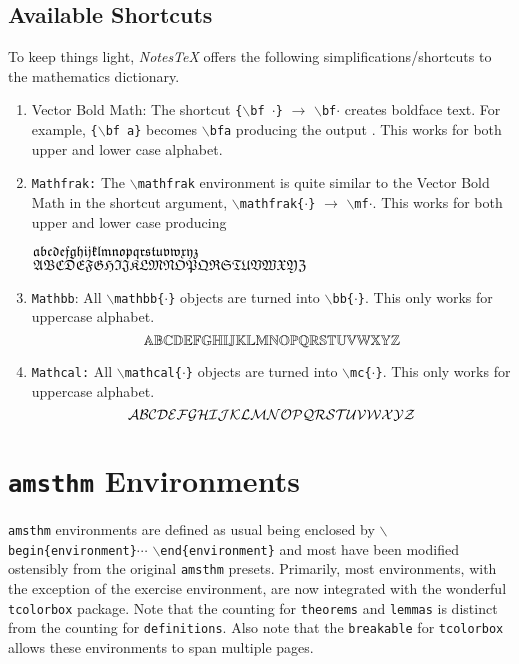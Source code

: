 \documentclass[10pt]{article}
\begin{document}
	\subsection{Available Shortcuts}
	To keep things light, \textit{NotesTeX} offers the following simplifications/shortcuts to the mathematics dictionary.
	\begin{enumerate}
		\item Vector Bold Math: The shortcut \texttt{\{$\backslash$bf $\cdot$\}} $\longrightarrow$ \texttt{$\backslash$bf$\cdot$} creates boldface text. For example, \texttt{\{$\backslash$bf a\}} becomes \texttt{$\backslash$bfa} producing the output \bfa. This works for both upper and lower case alphabet.
		\item \texttt{Mathfrak:} The \texttt{$\backslash$mathfrak} environment is quite similar to the Vector Bold Math in the shortcut argument, \texttt{$\backslash$mathfrak\{$\cdot$\}} $\longrightarrow$ \texttt{$\backslash$mf$\cdot$}. This works for both upper and lower case producing
		\begin{center}
			${\mathfrak{a}}{\mathfrak{b}}{\mathfrak{c}}{\mathfrak{d}}{\mathfrak{e}}{\mathfrak{f}}{\mathfrak{g}}{\mathfrak{h}}{\mathfrak{i}}{\mathfrak{j}}{\mathfrak{k}}{\mathfrak{l}}{\mathfrak{m}}{\mathfrak{n}}{\mathfrak{o}}{\mathfrak{p}}{\mathfrak{q}}{\mathfrak{r}}{\mathfrak{s}}{\mathfrak{t}}{\mathfrak{u}}{\mathfrak{v}}{\mathfrak{w}}{\mathfrak{x}}{\mathfrak{y}}{\mathfrak{z}}$\\
			${\mathfrak{A}}{\mathfrak{B}}{\mathfrak{C}}{\mathfrak{D}}{\mathfrak{E}}{\mathfrak{F}}{\mathfrak{G}}{\mathfrak{H}}{\mathfrak{I}}{\mathfrak{J}}{\mathfrak{K}}{\mathfrak{L}}{\mathfrak{M}}{\mathfrak{N}}{\mathfrak{O}}{\mathfrak{P}}{\mathfrak{Q}}{\mathfrak{R}}{\mathfrak{S}}{\mathfrak{T}}{\mathfrak{U}}{\mathfrak{V}}{\mathfrak{W}}{\mathfrak{X}}{\mathfrak{Y}}{\mathfrak{Z}}$
		\end{center}
		\item \texttt{Mathbb}: All \texttt{$\backslash$mathbb\{$\cdot$\}} objects are turned into \texttt{$\backslash$bb\{$\cdot$\}}. This only works for uppercase alphabet.
		\begin{equation*}
			{\mathbb{A}}{\mathbb{B}}{\mathbb{C}}{\mathbb{D}}{\mathbb{E}}{\mathbb{F}}{\mathbb{G}}{\mathbb{H}}{\mathbb{I}}{\mathbb{J}}{\mathbb{K}}{\mathbb{L}}{\mathbb{M}}{\mathbb{N}}{\mathbb{O}}{\mathbb{P}}{\mathbb{Q}}{\mathbb{R}}{\mathbb{S}}{\mathbb{T}}{\mathbb{U}}{\mathbb{V}}{\mathbb{W}}{\mathbb{X}}{\mathbb{Y}}{\mathbb{Z}}
		\end{equation*}
		\item \texttt{Mathcal:} All \texttt{$\backslash$mathcal\{$\cdot$\}} objects are turned into \texttt{$\backslash$mc\{$\cdot$\}}. This only works for uppercase alphabet.
		\begin{equation*}
			{\mathcal{A}}{\mathcal{B}}{\mathcal{C}}{\mathcal{D}}{\mathcal{E}}{\mathcal{F}}{\mathcal{G}}{\mathcal{H}}{\mathcal{I}}{\mathcal{J}}{\mathcal{K}}{\mathcal{L}}{\mathcal{M}}{\mathcal{N}}{\mathcal{O}}{\mathcal{P}}{\mathcal{Q}}{\mathcal{R}}{\mathcal{S}}{\mathcal{T}}{\mathcal{U}}{\mathcal{V}}{\mathcal{W}}{\mathcal{X}}{\mathcal{Y}}{\mathcal{Z}}
		\end{equation*}
	\end{enumerate}


	\newpage
	\section{\texttt{amsthm} Environments}\label{Sub:Special}
	\texttt{amsthm} environments are defined as usual being enclosed by \texttt{$\backslash$begin\{environment\}}$\cdots$ \texttt{$\backslash$end\{environment\}} and most have been modified ostensibly from the original \texttt{amsthm} presets. Primarily, most environments, with the exception of the exercise environment, are now integrated with the wonderful \texttt{tcolorbox} package. Note that the counting for \texttt{theorems} and \texttt{lemmas} is distinct from the counting for \texttt{definitions}. Also note that the \texttt{breakable} for \texttt{tcolorbox} allows these environments to span multiple pages.
\end{document}

